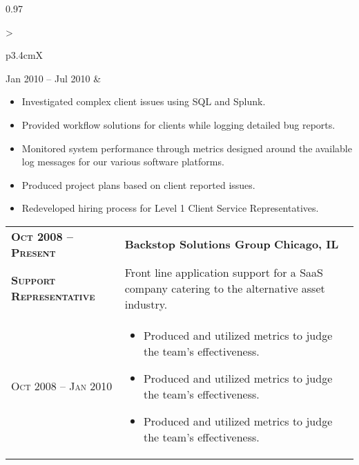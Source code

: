 \documentclass[a4paper, oneside, final]{scrartcl} %
\newcommand{\gray}{\rowcolor[gray]{.90}} %
\begin{document}
\begin{center}
\begin{tabularx}{0.97\linewidth}{>{\raggedright\scshape}p{3.4cm}X}
Jan 2010 -- Jul 2010 & \vspace{-6mm}
\begin{itemize}
\setlength{\itemsep}{0cm}%
\setlength{\parskip}{0cm}%
\item Investigated complex client issues using SQL and Splunk.
\item Provided workflow solutions for clients while logging detailed bug reports.
\item Monitored system performance through metrics designed around the available log messages for our various software platforms.
\item Produced project plans based on client reported issues.
\item Redeveloped hiring process for Level 1 Client Service Representatives.
\end{itemize}
\end{tabularx}

\begin{tabularx}{0.97\linewidth}{>{\raggedright\scshape}p{3.4cm}X}
\gray \textbf{Oct 2008 -- Present} & \textbf{Backstop Solutions Group} \hfill \textbf{Chicago, IL}\\ 
\textbf{Support Representative} & Front line application support for a SaaS company catering to the alternative asset industry.\\
Oct 2008 -- Jan 2010 & \vspace{-6mm}
\begin{itemize}
\setlength{\itemsep}{0cm}%
\setlength{\parskip}{0cm}%
\item Produced and utilized metrics to judge the team's effectiveness.
\item Produced and utilized metrics to judge the team's effectiveness.
\item Produced and utilized metrics to judge the team's effectiveness.\end{itemize}
\end{tabularx}


\end{center}
\end{document}
